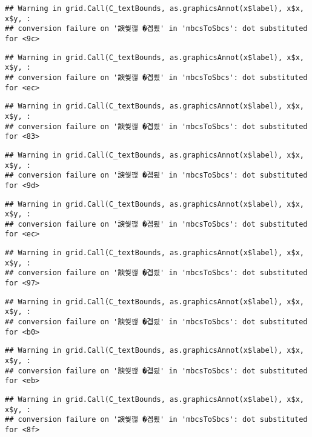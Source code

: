 \documentclass[
]{article}
\begin{document}
\begin{verbatim}
## Warning in grid.Call(C_textBounds, as.graphicsAnnot(x$label), x$x, x$y, :
## conversion failure on '諛쒖깮 �곕룄' in 'mbcsToSbcs': dot substituted for <9c>
\end{verbatim}

\begin{verbatim}
## Warning in grid.Call(C_textBounds, as.graphicsAnnot(x$label), x$x, x$y, :
## conversion failure on '諛쒖깮 �곕룄' in 'mbcsToSbcs': dot substituted for <ec>
\end{verbatim}

\begin{verbatim}
## Warning in grid.Call(C_textBounds, as.graphicsAnnot(x$label), x$x, x$y, :
## conversion failure on '諛쒖깮 �곕룄' in 'mbcsToSbcs': dot substituted for <83>
\end{verbatim}

\begin{verbatim}
## Warning in grid.Call(C_textBounds, as.graphicsAnnot(x$label), x$x, x$y, :
## conversion failure on '諛쒖깮 �곕룄' in 'mbcsToSbcs': dot substituted for <9d>
\end{verbatim}

\begin{verbatim}
## Warning in grid.Call(C_textBounds, as.graphicsAnnot(x$label), x$x, x$y, :
## conversion failure on '諛쒖깮 �곕룄' in 'mbcsToSbcs': dot substituted for <ec>
\end{verbatim}

\begin{verbatim}
## Warning in grid.Call(C_textBounds, as.graphicsAnnot(x$label), x$x, x$y, :
## conversion failure on '諛쒖깮 �곕룄' in 'mbcsToSbcs': dot substituted for <97>
\end{verbatim}

\begin{verbatim}
## Warning in grid.Call(C_textBounds, as.graphicsAnnot(x$label), x$x, x$y, :
## conversion failure on '諛쒖깮 �곕룄' in 'mbcsToSbcs': dot substituted for <b0>
\end{verbatim}

\begin{verbatim}
## Warning in grid.Call(C_textBounds, as.graphicsAnnot(x$label), x$x, x$y, :
## conversion failure on '諛쒖깮 �곕룄' in 'mbcsToSbcs': dot substituted for <eb>
\end{verbatim}

\begin{verbatim}
## Warning in grid.Call(C_textBounds, as.graphicsAnnot(x$label), x$x, x$y, :
## conversion failure on '諛쒖깮 �곕룄' in 'mbcsToSbcs': dot substituted for <8f>
\end{verbatim}
\end{document}

